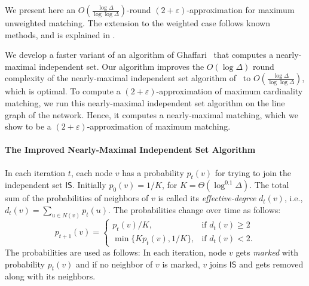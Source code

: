 \documentclass[11pt]{article}
\newcommand{\eps}{\varepsilon}
\begin{document}
We present here an $O(\frac{\log \Delta}{\log\log \Delta})$-round $(2+\eps)$-approximation for maximum unweighted matching. The extension to the weighted case follows known methods, and is explained in . 

We develop a faster variant of an algorithm of Ghaffari~\cite{Ghaffari2016} that computes a nearly-maximal independent set. Our algorithm improves the $O(\log \Delta)$ round complexity of the nearly-maximal independent set algorithm of~\cite{Ghaffari2016} to $O(\frac{\log \Delta}{\log\log \Delta})$, which is optimal. To compute a $(2+\eps)$-approximation of maximum cardinality matching, we run this nearly-maximal independent set algorithm on the line graph of the network. Hence, it computes a nearly-maximal matching, which we show to be a $(2+\eps)$-approximation of maximum matching.

\paragraph{The Improved Nearly-Maximal Independent Set Algorithm}
In each iteration $t$, each node $v$ has a probability $p_t(v)$ for trying to join the independent set $\mathsf{IS}$. Initially $p_0(v)=1/K$, for $K=\Theta(\log^{0.1} \Delta)$. The total sum of the probabilities of neighbors of $v$ is called its \emph{effective-degree} $d_{t}(v)$, i.e., $d_t(v)=\sum_{u \in N(v)} p_{t}(u)$. The probabilities change over time as follows: $$p_{t+1}(v)=
\begin{cases}
    p_{t}(v)/K, & \text{if } d_{t}(v)\geq 2\\
    \min\{Kp_{t}(v), 1/K\},  &\text{if } d_{t}(v)< 2.
\end{cases}
$$
The probabilities are used as follows: In each iteration, node $v$ gets \emph{marked} with probability $p_{t}(v)$ and if no neighbor of $v$ is marked, $v$ joins $\mathsf{IS}$ and gets removed along with its neighbors.
\end{document}
